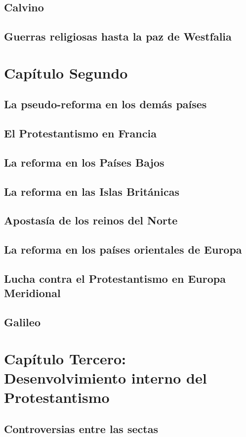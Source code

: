 \raggedbottom{} \documentclass[12pt]{book}
\begin{document}
\section{Calvino}
\section{Guerras religiosas hasta la paz de Westfalia}
\chapter{Capítulo Segundo}
\section{La pseudo-reforma en los demás países}
\section{El Protestantismo en Francia}
\section{La reforma en los Países Bajos}
\section{La reforma en las Islas Británicas}
\section{Apostasía de los reinos del Norte}
\section{La reforma en los países orientales de Europa}
\section{Lucha contra el Protestantismo en Europa Meridional}
\section{Galileo}
\chapter{Capítulo Tercero: Desenvolvimiento interno del Protestantismo}
\section{Controversias entre las sectas}
\end{document}

